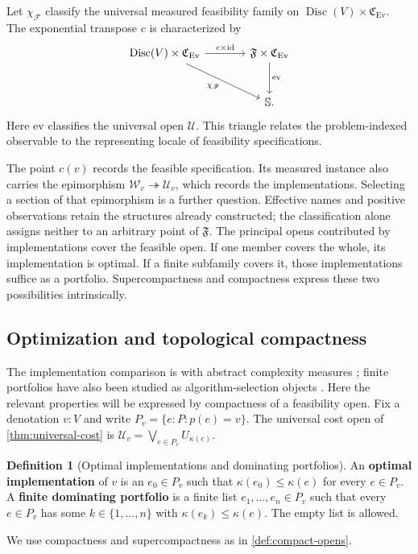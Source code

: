 \documentclass[11pt,a4paper]{article}
\numberwithin{algorithm}{section}
\numberwithin{equation}{section}
\theoremstyle{definition}
\newtheorem{definition}[definition]{Definition}
\theoremstyle{remark}
\theoremstyle{plain}
\newcommand{\id}{\operatorname{id}}
\newcommand{\onto}{\twoheadrightarrow}
\newcommand{\Ev}{{\operatorname{Ev}}}
\newcommand{\Cplx}{\mathfrak C_{\Ev}}
\theoremstyle{definition}
\theoremstyle{plain}
\begin{document}
Let $\chi_{\mathscr F}$ classify the universal measured feasibility
family on $\operatorname{Disc}(V)\times\Cplx$.
The exponential transpose $c$ is characterized by
\[
\begin{tikzcd}[column sep=large,row sep=large]
 \operatorname{Disc}(V)\times\Cplx
   \arrow[r,"{c\times\id}"] \arrow[dr,"{\chi_{\mathscr F}}"']
   & \mathfrak F\times\Cplx \arrow[d,"{\mathrm{ev}}"]\\
 & \mathbb S .
\end{tikzcd}
\]
Here $\mathrm{ev}$ classifies the universal open $\mathscr U$.
This triangle relates the problem-indexed observable to the
representing locale of feasibility specifications.


The point $c(v)$ records the feasible specification. Its measured
instance also carries the epimorphism $\mathscr W_v\onto\mathcal U_v$,
which records the implementations. Selecting a section of that
epimorphism is a further question. Effective names and positive
observations retain the structures already constructed; the
classification alone assigns neither to an arbitrary point of
$\mathfrak F$.
The principal opens contributed by implementations cover the feasible
open. If one member covers the whole, its implementation is optimal.
If a finite subfamily covers it, those implementations suffice as a
portfolio. Supercompactness and compactness express these two
possibilities intrinsically.

\subsection{Optimization and topological compactness}
\label{sec:optimality-topology}
The implementation comparison is with abstract complexity measures
\citep{Blum1967MachineIndependentComplexity}; finite portfolios have
also been studied as algorithm-selection objects
\citep{GomesSelman2001AlgorithmPortfolios}. Here the relevant
properties will be expressed by compactness of a feasibility open.
Fix a denotation $v:V$ and write $P_v=\{e:P:p(e)=v\}$.
The universal cost open of \cref{thm:universal-cost} is
$\mathcal U_v=\bigvee_{e\in P_v}U_{\kappa(e)}$.

\begin{definition}[Optimal implementations and dominating portfolios]\label{def:optimal-portfolios}
An \textbf{optimal implementation} of $v$ is an $e_0\in P_v$
such that $\kappa(e_0)\le\kappa(e)$ for every $e\in P_v$.
A \textbf{finite dominating portfolio} is a finite list
$e_1,\ldots,e_n\in P_v$ such that every $e\in P_v$ has some
$k\in\{1,\ldots,n\}$ with $\kappa(e_k)\le\kappa(e)$.
The empty list is allowed.
\end{definition}
We use compactness and supercompactness as in \cref{def:compact-opens}.
\end{document}
